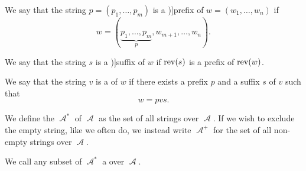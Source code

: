 \begin{definition}
\begin{thmenum}
    \mimprovised We say that the string \( p = (p_1, \ldots, p_m) \) is a \term[ru=начало (\cite[20]{Гладкий1973Языки})]{prefix} of \( w = (w_1, \ldots, w_n) \) if
    \begin{equation*}
      w = (\underbrace{p_1, \ldots, p_m}_p, w_{m+1}, \ldots, w_n).
    \end{equation*}

    \mimprovised We say that the string \( s \) is a \term[ru=конец (\cite[20]{Гладкий1973Языки})]{suffix} of \( w \) if \( \op{rev}(s) \) is a prefix of \( \op{rev}(w) \).

    \mimprovised We say that the string \( v \) is a  of \( w \) if there exists a prefix \( p \) and a suffix \( s \) of \( v \) such that
    \begin{equation*}
      w = p v s.
    \end{equation*}

     We define the  \( \mscrA^* \) of \( \mscrA \) as the set of all strings over \( \mscrA \). If we wish to exclude the empty string, like we often do, we instead write \( \mscrA^+ \) for the set of all non-empty strings over \( \mscrA \).

     We call any subset of \( \mscrA^* \) a  over \( \mscrA \).
  \end{thmenum}
\end{definition}

